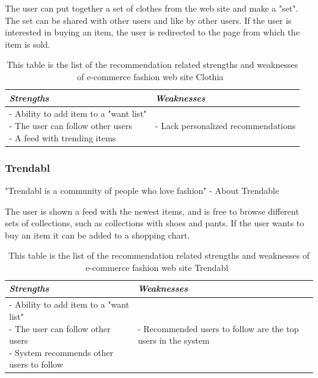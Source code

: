     The user can put together a set of clothes from the web site and make a "set".
    The set can be shared with other users and like by other users.
    If the user is interested in buying an item, the user is redirected to the page from which the item is sold.
    \begin{table}[H]
        \centering
        \begin{tabular}{l|l}
            \toprule
            \emph{Strengths} & \emph{Weaknesses} \\ \hline
            \pbox{9cm}{
                - Ability to add item to a "want list" \\
                - The user can follow other users \\
                - A feed with trending items
            } & \pbox{9cm}{
                - Lack personalized recommendations \\
            } \\ \bottomrule
        \end{tabular}
        \caption[Recommendation related strengths and weaknesses of Clothia~\cite{clothia}]{This table is the list of the recommendation related strengths and weaknesses of e-commerce fashion web site Clothia~\cite{clothia}}
        \label{table:ecommenreceClothia}
    \end{table}


\subsubsection{Trendabl} %
\label{par:trendabl}
    "Trendabl is a community of people who love fashion" - About Trendable~\cite{trendabl}

    The user is shown a feed with the newest items, and is free to browse different sets of collections, such as collections with shoes and pants.
    If the user wants to buy an item it can be added to a shopping chart.
    \begin{table}[H]
        \centering
        \begin{tabular}{l|l}
            \toprule
            \emph{Strengths} & \emph{Weaknesses} \\ \hline
            \pbox{9cm}{
                - Ability to add item to a "want list" \\
                - The user can follow other users \\
                - System recommends other users to follow
            } & \pbox{9cm}{
                - Recommended users to follow are the top users in the system \\
            } \\ \bottomrule
        \end{tabular}
        \caption[Recommendation related strengths and weaknesses of Trendabl~\cite{trendabl}]{This table is the list of the recommendation related strengths and weaknesses of e-commerce fashion web site Trendabl~\cite{trendabl}}
        \label{table:ecommenreceTrendabl}
    \end{table}

